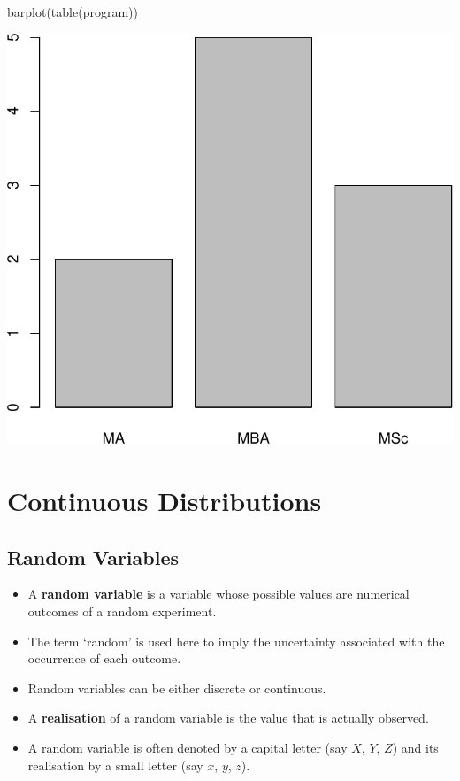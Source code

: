\documentclass[
]{article}
\newcommand{\FunctionTok}[1]{\textcolor[rgb]{0.00,0.00,0.00}{#1}}
\newcommand{\NormalTok}[1]{#1}
\providecommand{\tightlist}{%
  \setlength{\itemsep}{0pt}\setlength{\parskip}{0pt}}
\begin{document}
\begin{Highlighting}[]
\FunctionTok{barplot}\NormalTok{(}\FunctionTok{table}\NormalTok{(program))}
\end{Highlighting}

\begin{center}\includegraphics[width=1\linewidth,height=1\textheight]{unnamed-chunk-27-2} \end{center}

\pagebreak

\hypertarget{continuous-distributions}{%
\section{Continuous Distributions}\label{continuous-distributions}}

\hypertarget{random-variables}{%
\subsection{Random Variables}\label{random-variables}}

\begin{itemize}
\tightlist
\item
  A \textbf{random variable} is a variable whose possible values are
  numerical outcomes of a random experiment.
\item
  The term `random' is used here to imply the uncertainty associated
  with the occurrence of each outcome.
\item
  Random variables can be either discrete or continuous.
\item
  A \textbf{realisation} of a random variable is the value that is
  actually observed.
\item
  A random variable is often denoted by a capital letter (say \(X\),
  \(Y\), \(Z\)) and its realisation by a small letter (say \(x\), \(y\),
  \(z\)).
\end{itemize}
\end{document}
